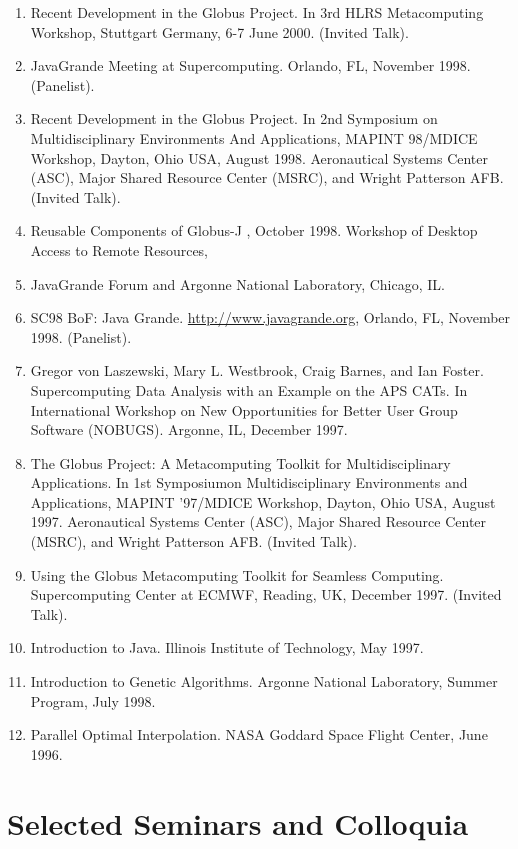 \documentclass{article}
\begin{document}
\begin{enumerate}
\item  Recent Development in the Globus Project. In 3rd HLRS Metacomputing Workshop, Stuttgart Germany, 6-7 June 2000. (Invited Talk). 
\item  JavaGrande Meeting at Supercomputing. Orlando, FL, November 1998. (Panelist). 
\item  Recent Development in the Globus Project. In 2nd Symposium on Multidisciplinary Environments And Applications, MAPINT 98/MDICE Workshop, Dayton, Ohio USA, August 1998. Aeronautical Systems Center (ASC), Major Shared Resource Center (MSRC), and Wright Patterson AFB. (Invited Talk). 
\item  Reusable Components of Globus-J , October 1998. Workshop of Desktop Access to Remote Resources,  
\item  JavaGrande Forum and Argonne National Laboratory, Chicago, IL.  
\item  SC98 BoF: Java Grande. \url{http://www.javagrande.org}, Orlando, FL, November 1998. (Panelist). 
\item  Gregor von Laszewski, Mary L. Westbrook, Craig Barnes, and Ian Foster. Supercomputing Data Analysis with an Example on the APS CATs. In International Workshop on New Opportunities for Better User Group Software (NOBUGS). Argonne, IL, December 1997.  
\item  The Globus Project: A Metacomputing Toolkit for Multidisciplinary Applications. In 1st Symposiumon Multidisciplinary Environments and Applications, MAPINT '97/MDICE Workshop, Dayton, Ohio USA, August 1997. Aeronautical Systems Center (ASC), Major Shared Resource Center (MSRC), and Wright Patterson AFB. (Invited Talk). 
\item  Using the Globus Metacomputing Toolkit for Seamless Computing. Supercomputing Center at ECMWF, Reading, UK, December 1997. (Invited Talk). 
\item  Introduction to Java. Illinois Institute of Technology, May 1997. 
\item  Introduction to Genetic Algorithms. Argonne National Laboratory, Summer Program, July 1998. 
\item  Parallel Optimal Interpolation. NASA Goddard Space Flight Center, June 1996. 
\end{enumerate}
 
\section{Selected Seminars and Colloquia}
\end{document}
